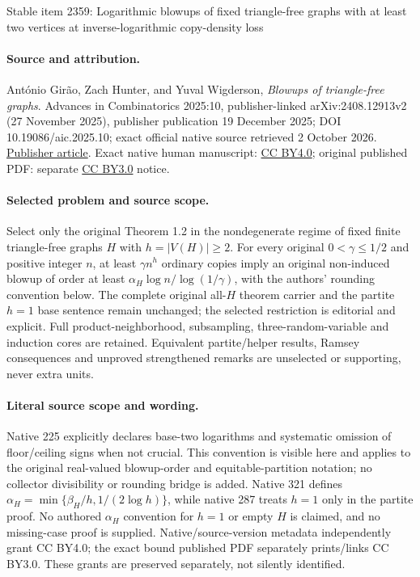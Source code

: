 \documentclass[11pt]{article}
\numberwithin{equation}{section}
\theoremstyle{plain}
\theoremstyle{remark}
\begin{document}
\begin{center}{\Large Stable item 2359: Logarithmic blowups of fixed triangle-free graphs with at least two vertices at inverse-logarithmic copy-density loss}\end{center}
\paragraph{Source and attribution.} António Girão, Zach Hunter, and Yuval Wigderson, \emph{Blowups of triangle-free graphs}. Advances in Combinatorics 2025:10, publisher-linked arXiv:2408.12913v2 (27 November 2025), publisher publication 19 December 2025; DOI 10.19086/aic.2025.10; exact official native source retrieved 2 October 2026. \href{https://www.advancesincombinatorics.com/article/151284-blowups-of-triangle-free-graphs}{Publisher article}. Exact native human manuscript: \href{https://creativecommons.org/licenses/by/4.0/}{CC BY4.0}; original published PDF: separate \href{https://creativecommons.org/licenses/by/3.0/}{CC BY3.0} notice.
\paragraph{Selected problem and source scope.} Select only the original Theorem 1.2 in the nondegenerate regime of fixed finite triangle-free graphs \(H\) with \(h=|V(H)|\geq2\). For every original \(0<\gamma\leq1/2\) and positive integer \(n\), at least \(\gamma n^h\) ordinary copies imply an original non-induced blowup of order at least \(\alpha_H\log n/\log(1/\gamma)\), with the authors' rounding convention below. The complete original all-\(H\) theorem carrier and the partite \(h=1\) base sentence remain unchanged; the selected restriction is editorial and explicit. Full product-neighborhood, subsampling, three-random-variable and induction cores are retained. Equivalent partite/helper results, Ramsey consequences and unproved strengthened remarks are unselected or supporting, never extra units.
\paragraph{Literal source scope and wording.} Native 225 explicitly declares base-two logarithms and systematic omission of floor/ceiling signs when not crucial. This convention is visible here and applies to the original real-valued blowup-order and equitable-partition notation; no collector divisibility or rounding bridge is added. Native 321 defines \(\alpha_H=\min\{\beta_H/h,1/(2\log h)\}\), while native 287 treats \(h=1\) only in the partite proof. No authored \(\alpha_H\) convention for \(h=1\) or empty \(H\) is claimed, and no missing-case proof is supplied. Native/source-version metadata independently grant CC BY4.0; the exact bound published PDF separately prints/links CC BY3.0. These grants are preserved separately, not silently identified.
\end{document}
